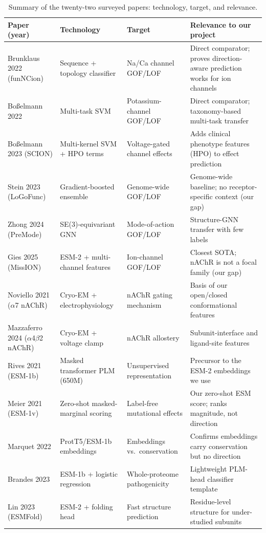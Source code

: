 \documentclass[11pt]{article}
\begin{document}
\begin{table}[ht]
\footnotesize
\caption{Summary of the twenty-two surveyed papers: technology, target, and relevance.}
\label{tab:summary}
\begin{tabular}{@{}p{3.1cm}p{3.3cm}p{3.4cm}p{4.0cm}@{}}
\toprule
\textbf{Paper (year)} & \textbf{Technology} & \textbf{Target} & \textbf{Relevance to our project} \\
\midrule
Brunklaus 2022 (funNCion) & Sequence + topology classifier & Na/Ca channel GOF/LOF & Direct comparator; proves direction-aware prediction works for ion channels \\
Bo{\ss}elmann 2022 & Multi-task SVM & Potassium-channel GOF/LOF & Direct comparator; taxonomy-based multi-task transfer \\
Bo{\ss}elmann 2023 (SCION) & Multi-kernel SVM + HPO terms & Voltage-gated channel effects & Adds clinical phenotype features (HPO) to effect prediction \\
Stein 2023 (LoGoFunc) & Gradient-boosted ensemble & Genome-wide GOF/LOF & Genome-wide baseline; no receptor-specific context (our gap) \\
Zhong 2024 (PreMode) & SE(3)-equivariant GNN & Mode-of-action GOF/LOF & Structure-GNN transfer with few labels \\
Gies 2025 (MissION) & ESM-2 + multi-channel features & Ion-channel GOF/LOF & Closest SOTA; nAChR is not a focal family (our gap) \\
\midrule
Noviello 2021 ($\alpha$7 nAChR) & Cryo-EM + electrophysiology & nAChR gating mechanism & Basis of our open/closed conformational features \\
Mazzaferro 2024 ($\alpha$4$\beta$2 nAChR) & Cryo-EM + voltage clamp & nAChR allostery & Subunit-interface and ligand-site features \\
\midrule
Rives 2021 (ESM-1b) & Masked transformer PLM (650M) & Unsupervised representation & Precursor to the ESM-2 embeddings we use \\
Meier 2021 (ESM-1v) & Zero-shot masked-marginal scoring & Label-free mutational effects & Our zero-shot ESM score; ranks magnitude, not direction \\
Marquet 2022 & ProtT5/ESM-1b embeddings & Embeddings vs.\ conservation & Confirms embeddings carry conservation but no direction \\
Brandes 2023 & ESM-1b + logistic regression & Whole-proteome pathogenicity & Lightweight PLM-head classifier template \\
Lin 2023 (ESMFold) & ESM-2 + folding head & Fast structure prediction & Residue-level structure for under-studied subunits \\

\end{tabular}
\end{table}
\end{document}
